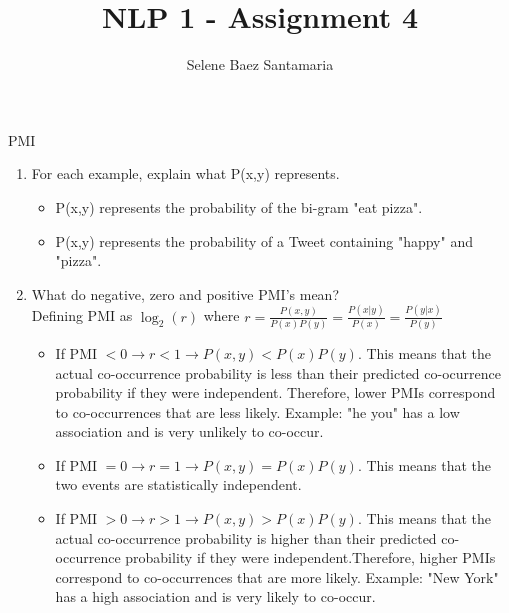 \documentclass[12pt]{article}
\newenvironment{exercise}[2][Exercise]{\begin{trivlist}
\item[\hskip \labelsep {\bfseries #1}\hskip \labelsep {\bfseries #2.}]}{\end{trivlist}}
\begin{document}
 
 
 
\title{NLP 1 - Assignment 4}%
\author{Selene Baez Santamaria} %
\maketitle
 
\begin{exercise}{1} PMI
\begin{enumerate}[label=(\alph*)]

\item For each example, explain what P(x,y) represents. 

	\begin{itemize}
	\item P(x,y) represents the probability of the bi-gram "eat pizza".
	\item P(x,y) represents the probability of a Tweet containing "happy" and "pizza".
	\end{itemize}
  
\item What do negative, zero and positive PMI's mean? \\
Defining PMI as $\log_2(r)$ where $r = \frac{P(x,y)}{P(x)P(y)} = \frac{P(x|y)}{P(x)} = \frac{P(y|x)}{P(y)}$

\begin{itemize}
\item If PMI $< 0 \rightarrow r < 1 \rightarrow P(x,y) < P(x)P(y)$. This means that the actual co-occurrence probability is less than their predicted co-ocurrence probability if they were independent. Therefore, lower PMIs correspond to co-occurrences that are less likely. Example: "he you" has a low association and is very unlikely to co-occur.

\item If PMI $= 0 \rightarrow r = 1 \rightarrow P(x,y) = P(x)P(y)$. This means that the two events are statistically independent. 

\item If PMI $> 0 \rightarrow r > 1 \rightarrow P(x,y) > P(x)P(y)$. This means that the actual co-occurrence probability is higher than their predicted co-occurrence probability if they were independent.Therefore, higher PMIs correspond to co-occurrences that are more likely. Example: "New York" has a high association and is very likely to co-occur. 
\end{itemize}

\end{enumerate}
\end{exercise}
 
\end{document}
